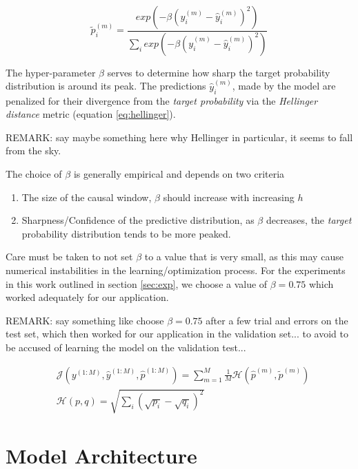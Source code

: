 \documentclass[twoside]{article}
\begin{document}
\begin{equation}\label{eq:targetprob}
\widetilde{p}_{i}^{(m)} = \frac{exp \left(- \beta (y_{i}^{(m)} - \hat{y}_{i}^{(m)})^{2} \right)}{\sum_{i}{exp \left(- \beta (y_{i}^{(m)} - \hat{y}_{i}^{(m)})^{2} \right)}} 
\end{equation}

The hyper-parameter $\beta$ serves to determine how sharp the target probability distribution is around its peak. 
The predictions $\hat{y}^{(m)}_{i}$, made by the model are penalized for their divergence from the \emph{target probability} via 
the \emph{Hellinger distance} metric (equation \ref{eq:hellinger}).

REMARK: say maybe something here why Hellinger in particular, it seems to fall from the sky.


The choice of $\beta$ is generally empirical and depends on two criteria 
\begin{enumerate} \item The size of the causal window, $\beta$ should increase with increasing $h$ 
\item Sharpness/Confidence of the predictive distribution, as $\beta$ decreases, the \emph{target} probability distribution tends to be more peaked.  \end{enumerate}

Care must be taken to not set $\beta$ to a value that is very small, as this may cause numerical instabilities in the learning/optimization process. 
For the experiments in this work outlined in section \ref{sec:exp}, we choose a value of $\beta = 0.75$ which worked adequately for our application.


REMARK: say something like choose $\beta =0.75$ after a few trial and errors on the test set, which then worked for our application in the validation set...
to avoid to be accused of learning the model on the validation test...


\begin{align}\label{eq:hellinger}
& \mathcal{J}(y^{(1:M)}, \hat{y}^{(1:M)}, \hat{p}^{(1:M)}) = \sum_{m = 1}^{M}{\frac{1}{M} \mathcal{H}(\hat{p}^{(m)}, \widetilde{p}^{(m)})} \\
& \mathcal{H}(p, q) = \sqrt{\sum_{i}{(\sqrt{p_i} -  \sqrt{q_i})^2}}
\end{align}

\section{Model Architecture}
\end{document}
